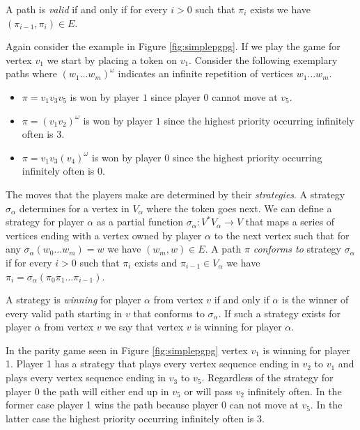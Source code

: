 A path is \textit{valid} if and only if for every $i > 0$ such that $\pi_i$ exists we have $(\pi_{i-1},\pi_i) \in E$.


\begin{example}
	Again consider the example in Figure \ref{fig:simplepgpg}. If we play the game for vertex $v_1$ we start by placing a token on $v_1$. Consider the following exemplary paths where $(w_1{\dots}w_m)^\omega$ indicates an infinite repetition of vertices $w_1{\dots}w_m$.
	\begin{itemize}
		\item $\pi = v_1v_3v_5$ is won by player $1$ since player $0$ cannot move at $v_5$.
		\item $\pi = (v_1v_2)^\omega$ is won by player $1$ since the highest priority occurring infinitely often is 3.
		\item $\pi = v_1v_3(v_4)^\omega$ is won by player $0$ since the highest priority occurring infinitely often is $0$.
	\end{itemize}
\end{example}

The moves that the players make are determined by their \textit{strategies}. A strategy $\sigma_\alpha$ determines for a vertex in $V_\alpha$ where the token goes next. We can define a strategy for player $\alpha$ as a partial function $\sigma_\alpha : V^*V_\alpha \rightarrow V$ that maps a series of vertices ending with a vertex owned by player $\alpha$ to the next vertex such that for any $\sigma_\alpha(w_0\dots w_m) = w$ we have $(w_m,w) \in E$. A path $\pi$ \textit{conforms to} strategy $\sigma_\alpha$ if for every $i > 0$ such that $\pi_i$ exists and $\pi_{i-1} \in V_\alpha$ we have $\pi_i = \sigma_\alpha(\pi_0\pi_1\dots\pi_{i-1})$.

A strategy is \textit{winning} for player $\alpha$ from vertex $v$ if and only if $\alpha$ is the winner of every valid path starting in $v$ that conforms to $\sigma_\alpha$. If such a strategy exists for player $\alpha$ from vertex $v$ we say that vertex $v$ is winning for player $\alpha$.

\begin{example}
	In the parity game seen in Figure \ref{fig:simplepgpg} vertex $v_1$ is winning for player 1. Player 1 has a strategy that plays every vertex sequence ending in $v_2$ to $v_1$ and plays every vertex sequence ending in $v_3$ to $v_5$. Regardless of the strategy for player 0 the path will either end up in $v_5$ or will pass $v_2$ infinitely often. In the former case player 1 wins the path because player 0 can not move at $v_5$. In the latter case the highest priority occurring infinitely often is 3.
\end{example}

